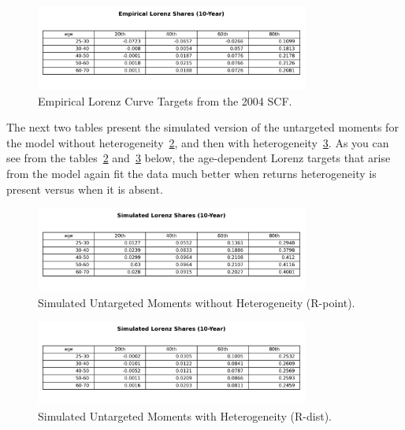\begin{figure}[h]
\centering
\includegraphics[width=0.8\textwidth]{Tables/Emp_Lorenz_10yr_LCrrDistNetWorth.png}
\caption{Empirical Lorenz Curve Targets from the 2004 SCF.}
\label{fig:EmpLorenzTar}
\end{figure}

\par The next two tables present the simulated version of the untargeted moments for the model without heterogeneity~\ref{fig:SimLorenzTarPoint}, and then with heterogeneity~\ref{fig:SimLorenzTarDist}. As you can see from the tables~\ref{fig:SimLorenzTarPoint} and~\ref{fig:SimLorenzTarDist} below, the age-dependent Lorenz targets that arise from the model again fit the data much better when returns heterogeneity is present versus when it is absent.

\begin{figure}[htbp]
\centering
\includegraphics[width=0.8\textwidth]{Tables/Sim_Lorenz_10yr_LCrrPointNetWorth.png}
\caption{Simulated Untargeted Moments without Heterogeneity (R-point).}
\label{fig:SimLorenzTarPoint}
\end{figure}

\begin{figure}[htbp]
\centering
\includegraphics[width=0.8\textwidth]{Tables/Sim_Lorenz_10yr_LCrrDistNetWorth.png}
\caption{Simulated Untargeted Moments with Heterogeneity (R-dist).}
\label{fig:SimLorenzTarDist}
\end{figure}



\par 





